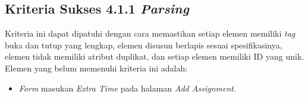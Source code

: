 \subsection{Kriteria Sukses 4.1.1 \textit{Parsing}}
\label{subsec:peningkatan_A_4.1.1}

Kriteria ini dapat dipatuhi dengan cara memastikan setiap elemen memiliki \textit{tag} buka dan tutup yang lengkap, elemen disusun berlapis sesuai spesifikasinya, elemen tidak memiliki atribut duplikat, dan setiap elemen memiliki ID yang unik. Elemen yang belum memenuhi kriteria ini adalah:

\begin{itemize}
	\item \textit{Form} masukan \textit{Extra Time} pada halaman \textit{Add Assignment}.
\end{itemize}
